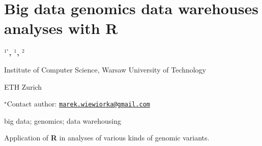 \documentclass[\main/boa.tex]{subfiles}
\begin{document}
\section{Big data genomics data warehouses analyses with R}

\begin{center}
  {\bf {}$^{1^\star}$, $^{1}$, $^{2}$}
\end{center}

\vskip 0.3cm

\begin{affiliations}
\begin{enumerate}
\begin{minipage}{0.915\textwidth}
\centering
\item Institute of Computer Science, Warsaw University of Technology \\[-2pt]
\item ETH Zurich \\[-2pt]
\end{minipage}
\end{enumerate}
$^\star$Contact author: \href{mailto:marek.wiewiorka@gmail.com}{\nolinkurl{marek.wiewiorka@gmail.com}}\\
\end{affiliations}

\vskip 0.5cm

\begin{minipage}{0.915\textwidth}
\keywords big data; genomics; data warehousing
\end{minipage}

\vskip 0.8cm

Application of \textbf{R} in analyses of various kinds of genomic
variants.
\end{document}
